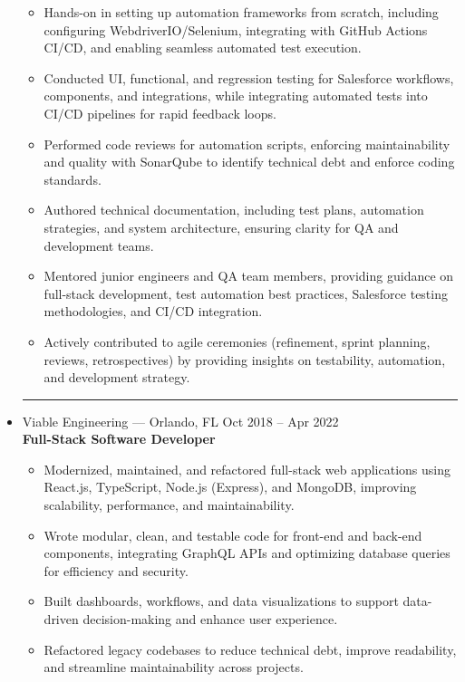 \documentclass[letterpaper,10pt]{article}
\newcommand{\separator}{\vspace{4pt}\hrule\vspace{4pt}}
\newcommand{\role}[2]{\textbf{#1}\hfill\textit{#2}}
\newcommand{\place}[2]{#1 \hfill #2}
\begin{document}
\begin{itemize}
{\begin{itemize}
            \item{Hands-on in setting up automation frameworks from scratch, including configuring WebdriverIO/Selenium, integrating with GitHub Actions CI/CD, and enabling seamless automated test execution.}
            \item{Conducted UI, functional, and regression testing for Salesforce workflows, components, and integrations, while integrating automated tests into CI/CD pipelines for rapid feedback loops.}
            \item{Performed code reviews for automation scripts, enforcing maintainability and quality with SonarQube to identify technical debt and enforce coding standards.}
            \item{Authored technical documentation, including test plans, automation strategies, and system architecture, ensuring clarity for QA and development teams.}
            \item{Mentored junior engineers and QA team members, providing guidance on full-stack development, test automation best practices, Salesforce testing methodologies, and CI/CD integration.}
            \item{Actively contributed to agile ceremonies (refinement, sprint planning, reviews, retrospectives) by providing insights on testability, automation, and development strategy.}
        \end{itemize}
    }
    \separator
    \item{
        \place{Viable Engineering — Orlando, FL}{Oct 2018 – Apr 2022} \\
        \role{Full-Stack Software Developer}{} \\
        \begin{itemize}
            \item{Modernized, maintained, and refactored full-stack web applications using React.js, TypeScript, Node.js (Express), and MongoDB, improving scalability, performance, and maintainability.}
            \item{Wrote modular, clean, and testable code for front-end and back-end components, integrating GraphQL APIs and optimizing database queries for efficiency and security.}
            \item{Built dashboards, workflows, and data visualizations to support data-driven decision-making and enhance user experience.}
            \item{Refactored legacy codebases to reduce technical debt, improve readability, and streamline maintainability across projects.}

\end{itemize}}
\end{itemize}
\end{document}
